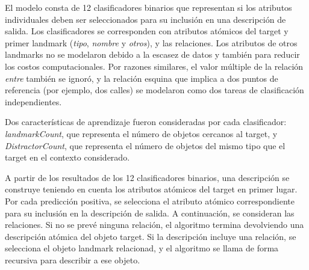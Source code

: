 


El modelo consta de 12 clasificadores binarios que representan si los atributos individuales deben ser seleccionados para su inclusi\'on en una descripci\'on de salida. Los clasificadores se corresponden con atributos at\'omicos del target y primer landmark ({\em tipo}, {\em nombre } y {\em otros}), y las relaciones. Los atributos de otros landmarks no se modelaron debido a la escasez de datos y tambi\'en para reducir los costos computacionales. Por razones similares, el valor m\'ultiple de la relaci\'on {\em entre} tambi\'en se ignor\'o, y la relaci\'on esquina que implica a dos puntos de referencia (por ejemplo, dos calles) se modelaron como dos tareas de clasificaci\'on independientes.

Dos caracter\'{i}sticas de aprendizaje fueron consideradas por cada clasificador: {\em landmarkCount}, que representa el n\'umero de objetos cercanos al target, y {\em DistractorCount}, que representa el n\'umero de objetos del mismo tipo que el target en el contexto considerado.

A partir de los resultados de los 12 clasificadores binarios, una descripci\'on se construye teniendo en cuenta los atributos at\'omicos del target en primer lugar. Por cada predicci\'on positiva, se selecciona el atributo at\'omico correspondiente para su inclusi\'on en la descripci\'on de salida. A continuaci\'on, se consideran las relaciones. Si no se prev\'e ninguna relaci\'on, el algoritmo termina devolviendo una descripci\'on at\'omica del objeto target. Si la descripci\'on incluye una relaci\'on, se selecciona el objeto landmark relacionad, y el algoritmo se llama de forma recursiva para describir a ese objeto.

